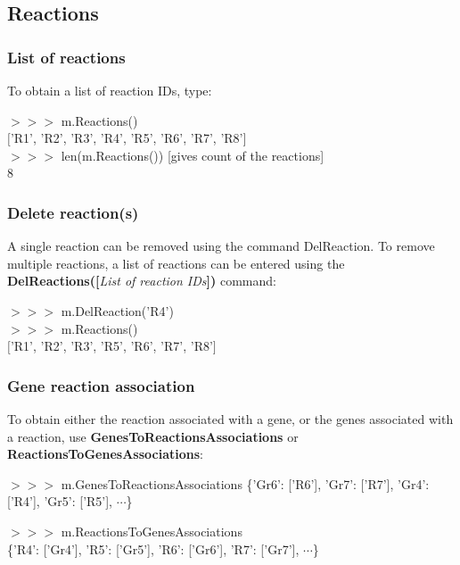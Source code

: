 \subsection{Reactions}
\subsubsection{List of reactions}
To obtain a list of reaction IDs, type:

\begin{framed}
$>>>$ m.Reactions()\\
$[$'R1', 'R2', 'R3', 'R4', 'R5', 'R6', 'R7', 'R8'$]$\\

$>>>$ len(m.Reactions()) [gives count of the reactions]\\
8 
\end{framed}
\subsubsection{Delete reaction(s)}
A single reaction can be removed using the command DelReaction. To remove multiple reactions, a list of reactions can be entered using the \textbf{DelReactions([}\textit{List of reaction IDs}\textbf{])} command:

\begin{framed}
$>>>$ m.DelReaction('R4')\\
$>>>$ m.Reactions()\\
$[$'R1', 'R2', 'R3', 'R5', 'R6', 'R7', 'R8'$]$
\end{framed}

\subsubsection{Gene reaction association}
To obtain either the reaction associated with a gene, or the genes associated with a reaction, use \textbf{GenesToReactionsAssociations} or \textbf{ReactionsToGenesAssociations}:

\begin{framed}
$>>>$ m.GenesToReactionsAssociations
\{'Gr6': ['R6'], 'Gr7': ['R7'], 'Gr4': ['R4'], 'Gr5': ['R5'], $\cdots$\}

$>>>$ m.ReactionsToGenesAssociations\\
\{'R4': ['Gr4'], 'R5': ['Gr5'], 'R6': ['Gr6'], 'R7': ['Gr7'], $\cdots$\}
\end{framed}

